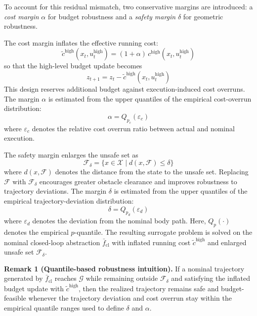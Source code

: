 \documentclass{article}
\begin{document}
To account for this residual mismatch, two conservative margins are introduced: a \emph{cost margin} $\alpha$ for budget robustness and a \emph{safety margin} $\delta$ for geometric robustness.

The cost margin inflates the effective running cost:
\begin{equation}
\tilde{c}^{\mathrm{high}}(x_t,u_t^{\mathrm{high}})
=(1+\alpha)\, c^{\mathrm{high}}(x_t,u_t^{\mathrm{high}})
\end{equation}
so that the high-level budget update becomes
\begin{equation}
z_{t+1}=z_t-\tilde{c}^{\mathrm{high}}(x_t,u_t^{\mathrm{high}})
\end{equation}
This design reserves additional budget against execution-induced cost overruns. The margin $\alpha$ is estimated from the upper quantiles of the empirical cost-overrun distribution:
\begin{equation}
\alpha = Q_{p_c}(\varepsilon_c)
\end{equation}
where $\varepsilon_c$ denotes the relative cost overrun ratio between actual and nominal execution.

The safety margin enlarges the unsafe set as~\citep{renganathan2023,theurkauf2023}
\begin{equation}
\mathcal{F}_{\delta}=\{x\in\mathcal{X}\mid d(x,\mathcal{F})\le \delta\}
\end{equation}
where $d(x,\mathcal{F})$ denotes the distance from the state to the unsafe set. Replacing $\mathcal{F}$ with $\mathcal{F}_{\delta}$ encourages greater obstacle clearance and improves robustness to trajectory deviations. The margin $\delta$ is estimated from the upper quantiles of the empirical trajectory-deviation distribution:
\begin{equation}
\delta = Q_{p_d}(\varepsilon_d)
\end{equation}
where $\varepsilon_d$ denotes the deviation from the nominal body path. Here, $Q_p(\cdot)$ denotes the empirical $p$-quantile. The resulting surrogate problem is solved on the nominal closed-loop abstraction $\bar{f}_{\mathrm{cl}}$ with inflated running cost $\tilde{c}^{\mathrm{high}}$ and enlarged unsafe set $\mathcal{F}_{\delta}$.

\noindent\textbf{Remark 1 (Quantile-based robustness intuition).}
If a nominal trajectory generated by $\bar{f}_{\mathrm{cl}}$ reaches $\mathcal{G}$ while remaining outside $\mathcal{F}_{\delta}$ and satisfying the inflated budget update with $\tilde{c}^{\mathrm{high}}$, then the realized trajectory remains safe and budget-feasible whenever the trajectory deviation and cost overrun stay within the empirical quantile ranges used to define $\delta$ and $\alpha$.
\end{document}
